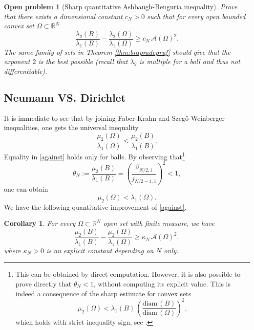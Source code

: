 \documentclass{amsart}
\newtheorem{corollary}[lemma]{Corollary}
\newtheorem{openpb}{Open problem}
\theoremstyle{definition}
\numberwithin{equation}{section}
\begin{document}
\begin{openpb}[Sharp quantitative Ashbaugh-Benguria inequality]
Prove that there exists a dimensional constant $c_N>0$ such that for every open bounded convex set $\Omega\subset\mathbb{R}^N$ 
\[
\frac{\lambda_2(B)}{\lambda_1(B)}-\frac{\lambda_2(\Omega)}{\lambda_1(\Omega)}\ge c_N\, \mathcal{A}(\Omega)^2.
\]
The same family of sets in Theorem \ref{thm:brapradepruf} should give that the exponent $2$ is the best possible (recall that $\lambda_2$ is multiple for a ball and thus not differentiable).
\end{openpb}

\subsection{Neumann VS. Dirichlet}
It is immediate to see that by joining Faber-Krahn and Szeg\H{o}-Weinberger inequalities, one gets the universal inequality
\begin{equation}
\label{against}
\frac{\mu_2(\Omega)}{\lambda_1(\Omega)}\le \frac{\mu_2(B)}{\lambda_1(B)}.
\end{equation}
Equality in \eqref{against} holds only for balls. By observing that\footnote{This can be obtained by direct computation. However, it is also possible to prove directly that $\theta_N<1$, without computing its explicit value. This is indeed a consequence of the sharp estimate for convex sets
\[
\mu_2(\Omega)<\lambda_1(B)\,\left(\frac{\mathrm{diam\,}(B)}{\mathrm{diam\,}(\Omega)}\right)^2,
\]
which holds with strict inequality sign, see \cite[Theorem 3.1 \& Corollary 3.2]{BraNitTro}.}
\begin{equation}
\label{thetaN}
\theta_N:=\frac{\mu_2(B)}{\lambda_1(B)}=\left(\frac{\beta_{N/2,1}}{j_{N/2-1,1}}\right)^2<1,
\end{equation}
one can obtain
\[
\mu_2(\Omega)<\lambda_1(\Omega).
\]
We have the following quantitative improvement of \eqref{against}. 
\begin{corollary}
For every $\Omega\subset\mathbb{R}^N$ open set with finite measure, we have
\begin{equation}
\label{mu2la1}
\frac{\mu_2(B)}{\lambda_1(B)}-\frac{\mu_2(\Omega)}{\lambda_1(\Omega)} \geq \kappa_N\,\mathcal{A}(\Omega)^2,
\end{equation}
where $\kappa_N>0$ is an explicit constant depending on $N$ only.
\end{corollary}
\end{document}
